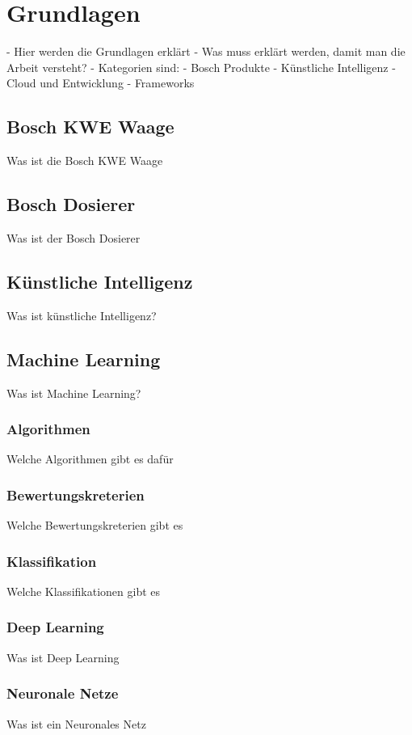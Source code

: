 \chapter{Grundlagen}
\label{ch:grundlagen}
- Hier werden die Grundlagen erklärt
- Was muss erklärt werden, damit man die Arbeit versteht?
- Kategorien sind:
- Bosch Produkte
- Künstliche Intelligenz
- Cloud und Entwicklung
- Frameworks

\section{Bosch KWE Waage}
Was ist die Bosch KWE Waage

\section{Bosch Dosierer}
Was ist der Bosch Dosierer

\section{Künstliche Intelligenz}
Was ist künstliche Intelligenz?

\section{Machine Learning}
Was ist Machine Learning?

\subsection{Algorithmen}
Welche Algorithmen gibt es dafür

\subsection{Bewertungskreterien}
Welche Bewertungskreterien gibt es

\subsection{Klassifikation}
Welche Klassifikationen gibt es

\subsection{Deep Learning}
Was ist Deep Learning

\subsection{Neuronale Netze}
Was ist ein Neuronales Netz

